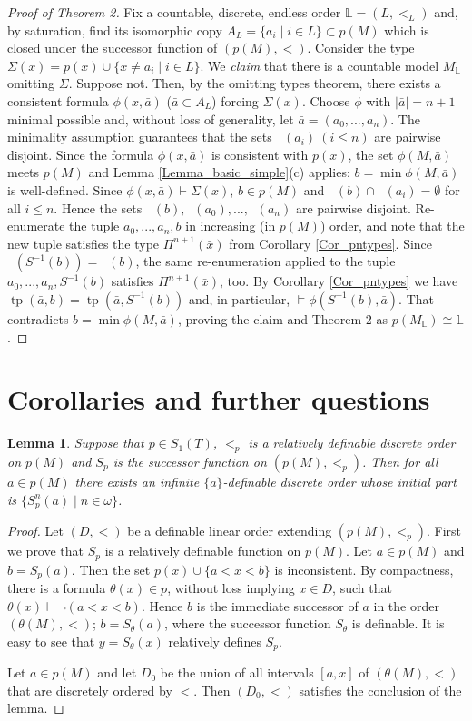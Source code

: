 \documentclass[12pt]{amsart}
\newtheorem{Lemma}[Theorem]{Lemma}
\theoremstyle{definition}
\DeclareMathOperator{\cl}{cl_S}
\DeclareMathOperator{\tp}{tp}
\begin{document}
 
\begin{proof}[{\it Proof of Theorem 2}]  Fix a countable, discrete, endless order $\mathbb L=(L,<_L)$ and, by saturation,  find its isomorphic copy $A_L=\{ a_i\mid i\in L\}\subset p(M)$  which is closed under the successor function of $(p(M),<)$. 
Consider the type $\Sigma(x)=p(x)\cup \{x\neq a_i\mid i\in L\}$. We {\it claim} that there is a countable model $M_{\mathbb L}$ omitting $\Sigma$. Suppose not. Then, by the omitting types theorem, there exists a consistent formula $\phi(x, \bar a)$ ($\bar a\subset A_L$) forcing $\Sigma(x)$. Choose $\phi$ with $|\bar a|=n+1$ minimal possible and, without loss of generality, let $\bar a=(a_0,...,a_n)$. 
The minimality assumption guarantees that the sets $\cl(a_i) \ ( i\leq n)$ are pairwise disjoint. Since the formula $\phi(x,\bar a)$ is consistent with $p(x)$, the set $\phi(M,\bar a)$ meets $p(M)$ and Lemma \ref{Lemma_basic_simple}(c) applies:  $b=\min \phi(M,\bar a)$ is well-defined. Since $\phi(x,\bar a)\vdash \Sigma(x)$, $b\in p(M)$ and $\cl(b)\cap \cl(a_i)=\emptyset$ for all $i\leq n$. 
Hence the sets $\cl(b), \cl(a_0),...,\cl(a_{n})$ are pairwise disjoint. Re-enumerate the tuple $a_0,...,a_n,b$ in increasing (in $p(M)$) order, and note that the new tuple satisfies the type $\Pi^{n+1}(\bar x)$ from Corollary \ref{Cor_pntypes}.  
Since $\cl(S^{-1}(b))=\cl(b)$,  the same re-enumeration applied to the tuple $a_0,...,a_n, S^{-1}(b)$ satisfies $\Pi^{n+1}(\bar x)$, too. By Corollary \ref{Cor_pntypes} we have $\tp(\bar a,b)=\tp(\bar a,S^{-1}(b))$ and, in particular, $\models  \phi(S^{-1}(b),\bar a)$. That contradicts $b=\min\phi(M,\bar a)$, proving the claim and Theorem 2 as $p(M_{\mathbb L})\cong \mathbb L$. 
\end{proof}

\section{Corollaries and further questions}
\begin{Lemma}\label{Lemma_reldef_DO}
Suppose that $p\in S_1(T)$, $<_p$ is a relatively definable discrete order on $p(M)$ and $S_p$ is the successor function on $(p(M),<_p)$. Then for all $a\in p(M)$ there exists  an infinite $\{a\}$-definable discrete  order whose initial part is $\{S_p^n(a)\mid n\in\omega\}$. 
\end{Lemma}
\begin{proof}
Let $(D,<)$ be a definable linear order extending $(p(M),<_p)$. 
 First we prove that $S_p$ is a relatively definable function on $p(M)$. Let $a\in p(M)$ and $b=S_p(a)$.  Then the set $p(x)\cup\{a<x<b\}$ is inconsistent. By compactness, there is a formula $\theta(x)\in p$, without loss  implying $x\in D$,  such that $\theta(x)\vdash \lnot (a<x<b)$. Hence $b$ is the immediate successor of $a$ in the order $(\theta(M),<)$; $b=S_{\theta}(a)$, where the successor function   $S_{\theta}$ is definable. It is easy to see that $y=S_{\theta}(x)$ relatively defines $S_p$.

Let $a\in p(M)$ and let $D_0$ be the union of all intervals $[a,x]$ of $(\theta(M),<)$ that are discretely ordered by $<$.
Then $(D_0,<)$ satisfies the conclusion of the lemma.
\end{proof}
\end{document}
